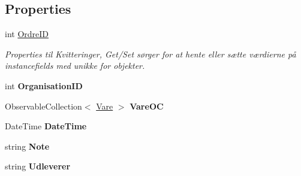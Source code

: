 \subsection*{Properties}
\begin{DoxyCompactItemize}
\item 
int \mbox{\hyperlink{class_r_f_storage_1_1_model_1_1_ordre_a38789ca8f1e1770fdc42322d4449cbd0}{Ordre\+ID}}
\begin{DoxyCompactList}\small\item\em Properties til Kvitteringer, Get/\+Set sørger for at hente eller sætte værdierne på instancefields med unikke for objekter. \end{DoxyCompactList}\item 
\mbox{\label{class_r_f_storage_1_1_model_1_1_ordre_a805d48f69e77de8fb5d9270627878126}} 
int {\bfseries Organisation\+ID}
\item 
\mbox{\label{class_r_f_storage_1_1_model_1_1_ordre_ac237fc88204e3c04940c39b1ba593656}} 
Observable\+Collection$<$ \mbox{\hyperlink{class_r_f_storage_1_1_model_1_1_vare}{Vare}} $>$ {\bfseries Vare\+OC}
\item 
\mbox{\label{class_r_f_storage_1_1_model_1_1_ordre_ab246b3ebbab713570cae51988eae0e42}} 
Date\+Time {\bfseries Date\+Time}
\item 
\mbox{\label{class_r_f_storage_1_1_model_1_1_ordre_a9db0aadb2e8745c6321676decfb4b51b}} 
string {\bfseries Note}
\item 
\mbox{\label{class_r_f_storage_1_1_model_1_1_ordre_a242640b544b8d4842f03dee5f3c2d31e}} 
string {\bfseries Udleverer}
\end{DoxyCompactItemize}


